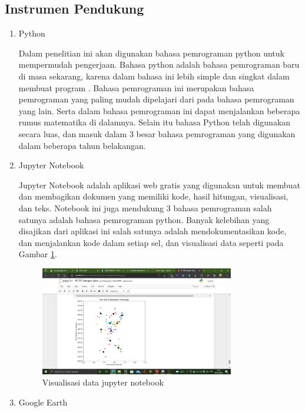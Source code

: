 \subsection{Instrumen Pendukung}
\begin{enumerate}
    \item Python
    
    Dalam penelitian ini akan digunakan bahasa pemrograman python untuk mempermudah pengerjaan. Bahasa python adalah bahasa pemrograman baru di masa sekarang, karena dalam bahasa ini lebih simple dan singkat dalam membuat program \cite{syahrudin2018input}. Bahasa pemrograman ini merupakan bahasa pemrograman yang paling mudah dipelajari dari pada bahasa pemrograman yang lain. Serta dalam bahasa pemrograman ini dapat menjalankan beberapa rumus matematika di dalamnya. Selain itu bahasa Python telah digunakan secara luas, dan masuk dalam 3 besar bahasa pemrograman yang digunakan dalam beberapa tahun belakangan.
    
    \item Jupyter Notebook
    
    Jupyter Notebook adalah aplikasi web gratis yang digunakan untuk membuat dan membagikan dokumen yang memiliki kode, hasil hitungan, visualisasi, dan teks. Notebook ini juga mendukung 3 bahasa pemrograman salah satunya adalah bahasa pemrograman python. Banyak kelebihan yang disajikan dari aplikasi ini salah satunya adalah mendokumentasikan kode, dan menjalankan kode dalam setiap sel, dan visualisasi data seperti pada Gambar \ref{fig:visjupyter}.

\begin{figure}[h!]
  \centering
  \includegraphics[width=0.8\textwidth]{visualisasi jupyter.png}
  \caption{Visualisasi data jupyter notebook}
  \label{fig:visjupyter}
\end{figure}

	\item Google Earth
	

\end{enumerate}
